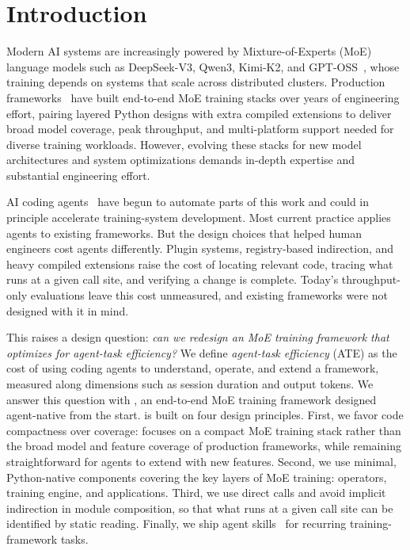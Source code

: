 \section{Introduction}
\label{sec:introduction}

Modern AI systems are increasingly powered by Mixture-of-Experts
(MoE) language models such as DeepSeek-V3, Qwen3, Kimi-K2, and
GPT-OSS~\cite{deepseekai2025deepseekv3technicalreport,yang2025qwen3technicalreport,openai2025gptoss120bgptoss20bmodel,kimiteam2026kimik2openagentic},
whose training depends on systems that scale across distributed
clusters. Production frameworks~\cite{shoeybi2020megatronlmtrainingmultibillionparameter,narayanan2021efficientlargescalelanguagemodel,deepspeed,rajbhandari2020zeromemoryoptimizationstraining} have built end-to-end MoE
training stacks over years of engineering effort, pairing layered
Python designs with extra compiled extensions to deliver broad
model coverage, peak throughput, and multi-platform support
needed for diverse training workloads.
However, evolving these stacks for new model architectures and
system optimizations demands in-depth expertise and substantial
engineering effort.

AI coding agents~\cite{claude-code,codex-cli,cursor,github-copilot}
have begun to automate parts of this work and could in principle
accelerate training-system development. Most current practice
applies agents to existing frameworks. But the design choices
that helped human engineers cost agents differently. Plugin
systems, registry-based indirection, and heavy compiled extensions
raise the cost of locating relevant code, tracing what runs at a
given call site, and verifying a change is complete. Today's
throughput-only evaluations leave this cost unmeasured, and
existing frameworks were not designed with it in mind.

This raises a design question: \emph{can we redesign an MoE
training framework that optimizes for agent-task efficiency?} We
define \emph{agent-task efficiency} (ATE) as the cost of using
coding agents to understand, operate, and extend a framework,
measured along dimensions such as session duration and output
tokens. We
answer this question with \sys, an end-to-end MoE training
framework designed agent-native from the start. \sys is built on
four design principles. First, we favor code compactness over
coverage: \sys focuses on a compact MoE training stack rather than
the broad model and feature coverage of production frameworks,
while remaining straightforward for agents to extend with new
features.
Second, we use minimal, Python-native components covering the key
layers of MoE training: operators, training engine, and
applications. Third, we use direct calls and avoid implicit
indirection in module composition, so that what runs at a given
call site can be identified by static reading. Finally, we ship
agent skills~\cite{anthropic-skills} for recurring
training-framework tasks.


